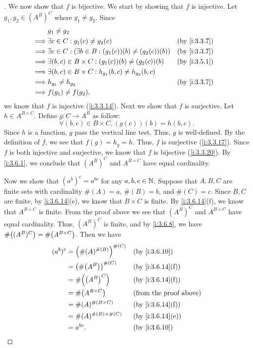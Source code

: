 \begin{proof}[]
  We now show that \(f\) is bijective.
  We start by showing that \(f\) is injective.
  Let \(g_1, g_2 \in (A^B)^C\) where \(g_1 \neq g_2\).
  Since
  \begin{align*}
             & g_1 \neq g_2                                                                         \\
    \implies & \exists c \in C : g_1(c) \neq g_2(c)                               &  & \by{i:3.3.7} \\
    \implies & \exists c \in C : (\exists b \in B : (g_1(c))(b) \neq (g_2(c))(b)) &  & \by{i:3.3.7} \\
    \implies & \exists (b, c) \in B \times C : (g_1(c))(b) \neq (g_2(c))(b)       &  & \by{i:3.5.1} \\
    \implies & \exists (b, c) \in B \times C : h_{g_1}(b, c) \neq h_{g_2}(b, c)                     \\
    \implies & h_{g_1} \neq h_{g_2}                                               &  & \by{i:3.3.7} \\
    \implies & f(g_1) \neq f(g_2),
  \end{align*}
  we know that \(f\) is injective (\cref{i:3.3.14}).
  Next we show that \(f\) is surjective.
  Let \(h \in A^{B \times C}\).
  Define \(g : C \to A^B\) as follow:
  \[
    \forall (b, c) \in B \times C, (g(c))(b) = h(b, c).
  \]
  Since \(h\) is a function, \(g\) pass the vertical line test.
  Thus, \(g\) is well-defined.
  By the definition of \(f\), we see that \(f(g) = h_g = h\).
  Thus, \(f\) is surjective (\cref{i:3.3.17}).
  Since \(f\) is both injective and surjective, we know that \(f\) is bijective (\cref{i:3.3.20}).
  By \cref{i:3.6.1}, we conclude that \((A^B)^C\) and \(A^{B \times C}\) have equal cardinality.

  Now we show that \((a^b)^c = a^{bc}\) for any \(a, b, c \in \mathbb{N}\).
  Suppose that \(A, B, C\) are finite sets with cardinality \(\#(A) = a\), \(\#(B) = b\), and \(\#(C) = c\).
  Since \(B, C\) are finite, by \cref{i:3.6.14}(e), we know that \(B \times C\) is finite.
  By \cref{i:3.6.14}(f), we know that \(A^{B \times C}\) is finite.
  From the proof above we see that \((A^B)^C\) and \(A^{B \times C}\) have equal cardinality.
  Thus, \((A^B)^C\) is finite, and by \cref{i:3.6.8}, we have \(\#\pa{(A^B)^C} = \#\pa{A^{B \times C}}\).
  Then we have
  \begin{align*}
    (a^b)^c & = \pa{\#(A)^{\#(B)}}^{\#(C)} &  & \by{i:3.6.10}                 \\
            & = \pa{\#\pa{A^B}}^{\#(C)}    &  & \by{i:3.6.14}[f]              \\
            & = \#\pa{\pa{A^B}^C}          &  & \by{i:3.6.14}[f]              \\
            & = \#\pa{A^{B \times C}}      &  & \text{(from the proof above)} \\
            & = \#(A)^{\#(B \times C)}     &  & \by{i:3.6.14}[f]              \\
            & = \#(A)^{\#(B) \times \#(C)} &  & \by{i:3.6.14}[e]              \\
            & = a^{bc}.                    &  & \by{i:3.6.10}
  \end{align*}


\end{proof}
